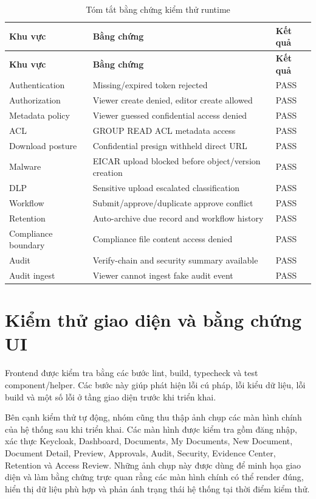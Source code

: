 \begin{longtable}{p{}p{}p{}}
\caption{Tóm tắt bằng chứng kiểm thử runtime}
\label{tab:runtime-evidence} \\
\toprule
\textbf{Khu vực} & \textbf{Bằng chứng} & \textbf{Kết quả} \\
\midrule
\endfirsthead
\toprule
\textbf{Khu vực} & \textbf{Bằng chứng} & \textbf{Kết quả} \\
\midrule
\endhead
Authentication & Missing/expired token rejected & PASS \\
Authorization & Viewer create denied, editor create allowed & PASS \\
Metadata policy & Viewer guessed confidential access denied & PASS \\
ACL & GROUP READ ACL metadata access & PASS \\
Download posture & Confidential presign withheld direct URL & PASS \\
Malware & EICAR upload blocked before object/version creation & PASS \\
DLP & Sensitive upload escalated classification & PASS \\
Workflow & Submit/approve/duplicate approve conflict & PASS \\
Retention & Auto-archive due record and workflow history & PASS \\
Compliance boundary & Compliance file content access denied & PASS \\
Audit & Verify-chain and security summary available & PASS \\
Audit ingest & Viewer cannot ingest fake audit event & PASS \\
\bottomrule
\end{longtable}

\section{Kiểm thử giao diện và bằng chứng UI}

Frontend được kiểm tra bằng các bước lint, build, typecheck và test component/helper. Các bước này giúp phát hiện lỗi cú pháp, lỗi kiểu dữ liệu, lỗi build và một số lỗi ở tầng giao diện trước khi triển khai.

Bên cạnh kiểm thử tự động, nhóm cũng thu thập ảnh chụp các màn hình chính của hệ thống sau khi triển khai. Các màn hình được kiểm tra gồm đăng nhập, xác thực Keycloak, Dashboard, Documents, My Documents, New Document, Document Detail, Preview, Approvals, Audit, Security, Evidence Center, Retention và Access Review. Những ảnh chụp này được dùng để minh họa giao diện và làm bằng chứng trực quan rằng các màn hình chính có thể render đúng, hiển thị dữ liệu phù hợp và phản ánh trạng thái hệ thống tại thời điểm kiểm thử.


